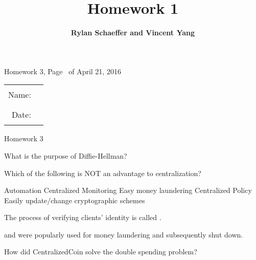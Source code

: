 \documentclass{exam}
\title{\bf Homework 1}
\author{\bf Rylan Schaeffer and Vincent Yang}
\begin{document}
\pagestyle{headandfoot}
\runningheadrule
{}
              {Homework 3, Page \thepage\ of \numpages}
              {April 21, 2016}
\firstpagefooter{}{}{}
\runningfooter{}{}{}
\begin{tabular}{rl}
Name:  & \rule{0.25\linewidth}{\linethickness} \\ 
Date:  & \rule{0.25\linewidth}{\linethickness} \\ 
\end{tabular}
\vspace{5mm}

\begin{center} 
  \Large Homework 3
\end{center} 

\begin{center}
\end{center}

\addpoints
\begin{center}
\gradetable[h][questions]
\end{center}


\begin{questions}

  \question[12] 
  What is the purpose of Diffie-Hellman?
  \fillwithlines{.8in}

  \question[3]
  Which of the following is NOT an advantage to centralization?
  \begin{choices}
    \choice Automation
    \choice Centralized Monitoring
    \choice Easy money laundering
    \choice Centralized Policy
    \choice Easily update/change cryptographic schemes
  \end{choices}

  \question[5] The process of verifying clients' identity is called . 

  \question[5]  and  were popularly used for money laundering and subsequently shut down.

  \question[25] How did CentralizedCoin solve the double spending problem?
  \fillwithlines{.8in}
\end{questions}
\end{document}
